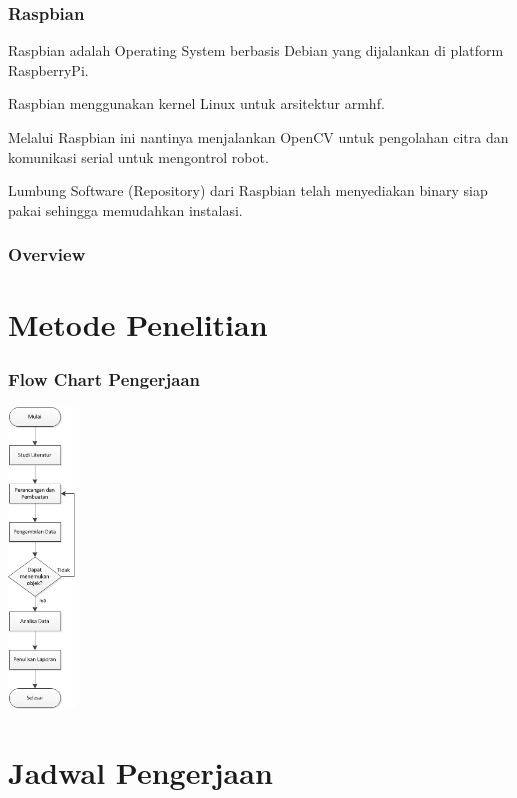 \documentclass[table,dvipsnames]{beamer}
\begin{document}
\begin{frame}
\frametitle{Raspbian}
\begin{block}{}
Raspbian adalah Operating System berbasis Debian yang dijalankan di platform RaspberryPi.
\end{block}
\begin{block}{}
Raspbian menggunakan kernel Linux untuk arsitektur armhf.
\end{block}
\begin{block}{}
Melalui Raspbian ini nantinya menjalankan OpenCV untuk pengolahan citra dan komunikasi serial untuk mengontrol robot.
\end{block}
\begin{block}{}
Lumbung Software (Repository) dari Raspbian telah menyediakan binary siap pakai sehingga memudahkan instalasi.
\end{block}
\end{frame}

\begin{frame}
\frametitle{Overview}
\tableofcontents
\end{frame}

\section{Metode Penelitian}

\begin{frame}
\frametitle{Flow Chart Pengerjaan}
\begin{center}
 \includegraphics[width=50pt]{./met_pen/flow}
\end{center}
\end{frame}

\section{Jadwal Pengerjaan}
\end{document}

